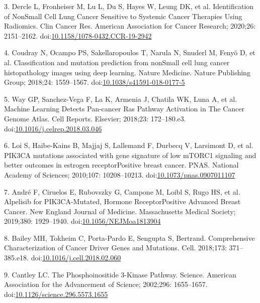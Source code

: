 \documentclass[10pt,letterpaper]{article}
\begin{document}
\leavevmode\hypertarget{ref-dercleIdentificationNonSmall2020}{}%
3. Dercle L, Fronheiser M, Lu L, Du S, Hayes W, Leung DK, et al.
Identification of NonSmall Cell Lung Cancer Sensitive to Systemic Cancer
Therapies Using Radiomics. Clin Cancer Res. American Association for
Cancer Research; 2020;26: 2151--2162.
doi:\href{https://doi.org/10.1158/1078-0432.CCR-19-2942}{10.1158/1078-0432.CCR-19-2942}

\leavevmode\hypertarget{ref-coudrayClassificationMutationPrediction2018}{}%
4. Coudray N, Ocampo PS, Sakellaropoulos T, Narula N, Snuderl M, Fenyö
D, et al. Classification and mutation prediction from nonSmall cell lung
cancer histopathology images using deep learning. Nature Medicine.
Nature Publishing Group; 2018;24: 1559--1567.
doi:\href{https://doi.org/10.1038/s41591-018-0177-5}{10.1038/s41591-018-0177-5}

\leavevmode\hypertarget{ref-wayMachineLearningDetects2018}{}%
5. Way GP, Sanchez-Vega F, La K, Armenia J, Chatila WK, Luna A, et al.
Machine Learning Detects Pan-cancer Ras Pathway Activation in The Cancer
Genome Atlas. Cell Reports. Elsevier; 2018;23: 172--180.e3.
doi:\href{https://doi.org/10.1016/j.celrep.2018.03.046}{10.1016/j.celrep.2018.03.046}

\leavevmode\hypertarget{ref-loiPIK3CAMutationsAssociated2010}{}%
6. Loi S, Haibe-Kains B, Majjaj S, Lallemand F, Durbecq V, Larsimont D,
et al. PIK3CA mutations associated with gene signature of low mTORC1
signaling and better outcomes in estrogen receptorPositive breast
cancer. PNAS. National Academy of Sciences; 2010;107: 10208--10213.
doi:\href{https://doi.org/10.1073/pnas.0907011107}{10.1073/pnas.0907011107}

\leavevmode\hypertarget{ref-andre_2019_alpelisib_nengljmeda}{}%
7. André F, Ciruelos E, Rubovszky G, Campone M, Loibl S, Rugo HS, et al.
Alpelisib for PIK3CA-Mutated, Hormone ReceptorPositive Advanced Breast
Cancer. New England Journal of Medicine. Massachusetts Medical Society;
2019;380: 1929--1940.
doi:\href{https://doi.org/10.1056/NEJMoa1813904}{10.1056/NEJMoa1813904}

\leavevmode\hypertarget{ref-baileyComprehensiveCharacterizationCancer2018}{}%
8. Bailey MH, Tokheim C, Porta-Pardo E, Sengupta S, Bertrand.
Comprehensive Characterization of Cancer Driver Genes and Mutations.
Cell. 2018;173: 371--385.e18.
doi:\href{https://doi.org/10.1016/j.cell.2018.02.060}{10.1016/j.cell.2018.02.060}

\leavevmode\hypertarget{ref-cantleyPhosphoinositide3KinasePathway2002}{}%
9. Cantley LC. The Phosphoinositide 3-Kinase Pathway. Science. American
Association for the Advancement of Science; 2002;296: 1655--1657.
doi:\href{https://doi.org/10.1126/science.296.5573.1655}{10.1126/science.296.5573.1655}
\end{document}
